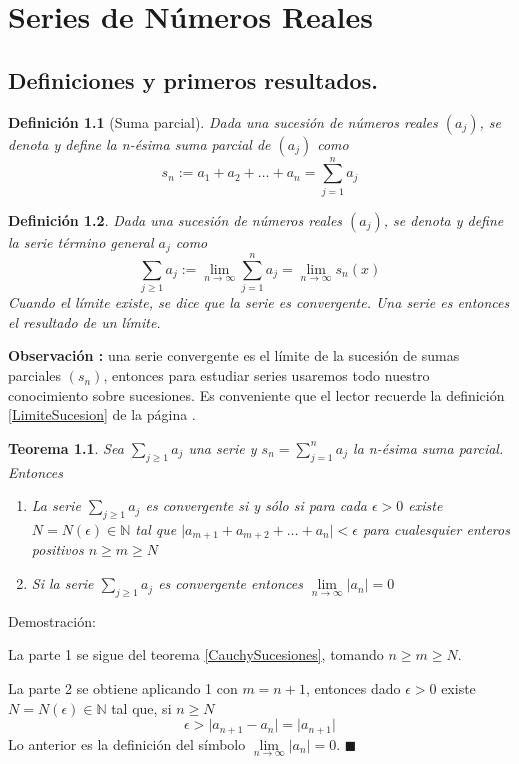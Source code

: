 \documentclass[12pt]{book}
\newcommand\N{{\mathbb N}}
\newcommand{\fullref}[1]{\ref{#1} de la página \pageref{#1}}
\providecommand{\abs}[1]{\lvert#1\rvert}
\newtheorem{teo}{Teorema}[section]
\newtheorem{defi}{Definición}[section]
\begin{document}
\chapter{Series de Números Reales}
\section{Definiciones y primeros resultados.}
\begin{defi}[Suma parcial]\rm
Dada una sucesión de números reales $(a_j)$, se denota y define la n-ésima suma parcial de $(a_j)$ como $$s_n:=a_1+a_2+\dots+a_n=\sum_{j=1}^n a_j$$
\end{defi}
\begin{defi}\rm
Dada una sucesión de números reales $(a_j)$, se denota y define la serie término general $a_j$ como
$$\sum_{j \ge 1} a_j :=\lim\limits_{n\to\infty}\sum_{j=1}^n a_j=\lim\limits_{n\to\infty}s_n(x)$$
Cuando el límite existe, se dice que la serie es convergente. Una serie es entonces el resultado de un límite.
\end{defi}
\textbf{Observación :} una serie convergente es el límite de la sucesión de sumas parciales $(s_n)$, entonces para estudiar series usaremos todo nuestro conocimiento sobre sucesiones. Es conveniente que el lector recuerde la definición \fullref{LimiteSucesion}.
\begin{teo}\label{CondicionAbsolutoConverSeries}\rm
Sea $\sum_{j \ge 1} a_j$ una serie y $s_n=\sum_{j=1}^n a_j$ la n-ésima suma parcial. Entonces
\begin{enumerate}
    \item La serie $\sum_{j \ge 1} a_j$ es convergente si y sólo si para cada $\epsilon>0$ existe $N=N(\epsilon) \in \N$ tal que $\abs{a_{m+1}+a_{m+2}+\dots+a_n}<\epsilon$ para cualesquier enteros positivos $n \ge m \ge N$
    \item Si la serie $\sum_{j \ge 1} a_j$ es convergente entonces $\lim\limits_{n\to\infty}\abs{a_n}=0$
\end{enumerate}
\end{teo}
Demostración:

La parte 1 se sigue del teorema \ref{CauchySucesiones}, tomando $n \ge m \ge N$.

La parte 2 se obtiene aplicando 1 con $m=n+1$, entonces dado $\epsilon>0$ existe $N=N(\epsilon) \in \N$ tal que, si $n \ge N$ $$\epsilon>\abs{a_{n+1}-a_n}=\abs{a_{n+1}}$$
Lo anterior es la definición del símbolo $\lim\limits_{n\to\infty}\abs{a_n}=0$. $\blacksquare$
\end{document}
